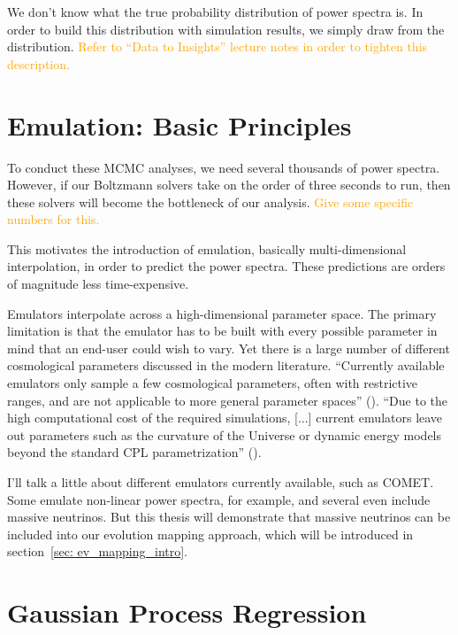 We don't know what the true probability distribution of power spectra is. In order to build this distribution with simulation results, we simply draw from the distribution. \textcolor{orange}{Refer to ``Data to Insights'' lecture notes in order to tighten this description.}

\section{Emulation: Basic Principles}
\label{sec: emulation_intro}

To conduct these MCMC analyses, we need several thousands of power spectra. However, if our Boltzmann solvers take on the order of three seconds to run, then these solvers will become the bottleneck of our analysis. \textcolor{orange}{Give some specific numbers for this.}

This motivates the introduction of emulation, basically multi-dimensional interpolation, in order to predict the power spectra. These predictions are orders of magnitude less time-expensive. 

Emulators interpolate across a high-dimensional parameter space. The primary
limitation is that the emulator has to be built with every possible parameter
in mind that an end-user could wish to vary. Yet there is a large number of
different cosmological parameters discussed in the modern literature.
``Currently available emulators only sample a few cosmological parameters,
often with restrictive ranges, and are not applicable to more general
parameter
spaces'' (). ``Due to the high computational cost of the required
simulations, [...] current emulators leave out parameters such as the
curvature
of the Universe or dynamic energy models beyond the standard CPL
parametrization'' ().

I'll talk a little about different emulators currently available, such as COMET. Some emulate non-linear power spectra, for example, and several even include massive neutrinos. But this thesis will demonstrate that massive neutrinos can be included into our evolution mapping approach, which will be introduced in section~\ref{sec: ev_mapping_intro}.


\section{Gaussian Process Regression}

